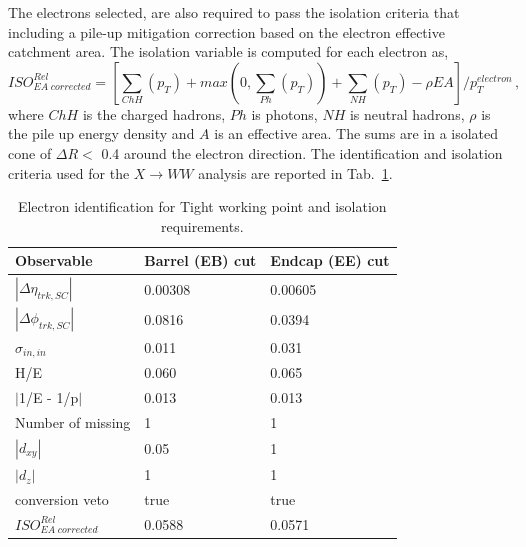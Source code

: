 The electrons selected, are also required to pass the isolation criteria that including a pile-up mitigation correction based on the electron effective 
catchment area. The isolation variable is computed for each electron as,
\begin{equation}
ISO^{Rel}_{EA\; corrected}=[\sum_{ChH}(p_T) + max(0, \sum_{Ph}(p_T)) +\sum_{NH}(p_T)  -\rho EA ]/p_T^{electron} \, ,
\end{equation}
where $ChH$ is the charged hadrons, $Ph$ is photons, $NH$ is neutral hadrons, $\rho$ is the pile up energy
density and $A$ is an effective area. The sums are in a isolated cone of $\Delta R<$ 0.4 around the electron direction.
The identification and isolation criteria used for the $X \to WW$ analysis are reported in Tab.~\ref{IDe}.

\begin{table}
\centering
\begin{tabular}{|lll|}
\hline
Observable & Barrel (EB) cut &Endcap (EE) cut\\
\hline
$|\Delta \eta_{trk,SC}|$  &0.00308  & 0.00605 \\
$|\Delta \phi_{trk,SC}|$ & 0.0816   &0.0394\\
$\sigma_{in,in}$ &0.011& 0.031\\
H/E & 0.060& 0.065\\
$|$1/E - 1/p$|$ & 0.013 &0.013\\
Number of missing &1&1\\
$|d_{xy}|$ &0.05&1\\
$|d_z|$ &1&1\\
conversion veto& true&true\\ 
\hline
$ISO^{Rel}_{EA\; corrected}$&0.0588 & 0.0571\\
\hline

\end{tabular}
\caption{Electron identification for Tight working point  and isolation requirements.}
\label{IDe}
\end{table}

